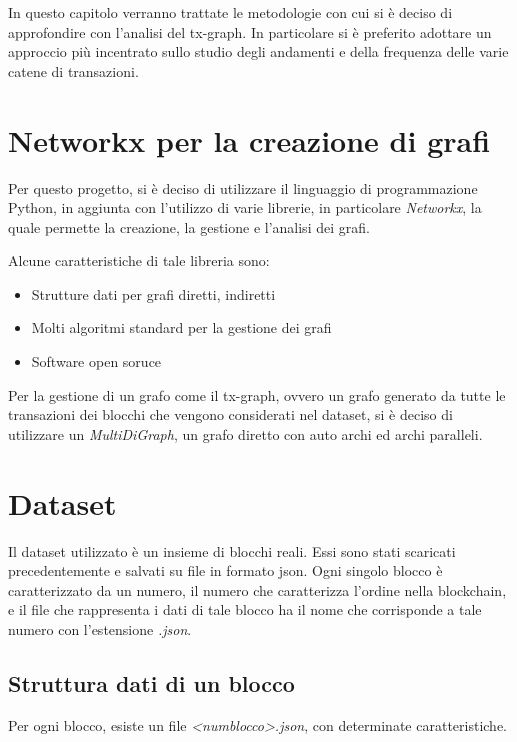 In questo capitolo verranno trattate le metodologie con cui si è deciso di approfondire con l'analisi del tx-graph. In particolare si è preferito adottare un approccio più incentrato sullo studio degli andamenti e della frequenza delle varie catene di transazioni.

\section{Networkx per la creazione di grafi}

Per questo progetto, si è deciso di utilizzare il linguaggio di programmazione Python, in aggiunta con l'utilizzo di varie librerie, in particolare \textit{Networkx}, la quale permette la creazione, la gestione e l'analisi dei grafi. 

Alcune caratteristiche di tale libreria sono:
\begin{itemize}
	\item Strutture dati per grafi diretti, indiretti
	\item Molti algoritmi standard per la gestione dei grafi
	\item Software open soruce
\end{itemize}

Per la gestione di un grafo come il tx-graph, ovvero un grafo generato da tutte le transazioni dei blocchi che vengono considerati nel dataset, si è deciso di utilizzare un \textit{MultiDiGraph}, un grafo diretto con auto archi ed archi paralleli.

\section{Dataset}

Il dataset utilizzato è un insieme di blocchi reali. Essi sono stati scaricati precedentemente e salvati su file in formato json. Ogni singolo blocco è caratterizzato da un numero, il numero che caratterizza l'ordine nella blockchain, e il file che rappresenta i dati di tale blocco ha il nome che corrisponde a tale numero con l'estensione \textit{.json}.

\subsection{Struttura dati di un blocco}
Per ogni blocco, esiste un file \textit{<numblocco>.json}, con determinate caratteristiche. 

